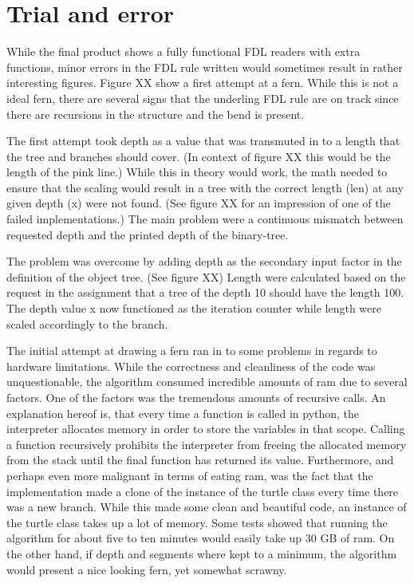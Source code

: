 \documentclass[titlepage]{article}
\begin{document}
\section{Trial and error}
While the final product shows a fully functional FDL readers with extra functions, minor errors in the FDL rule written would sometimes result in rather interesting figures. Figure XX  show a first attempt at a fern. While this is not a ideal fern, there are several signs that the underling FDL rule are on track since there are recursions in the structure and the bend is present. \par
The first attempt took depth as a value that was transmuted in to a length that the tree and branches should cover. (In context of figure XX  this would be the length of the pink line.) 
While this in theory would work, the math needed to ensure that the scaling would result in a tree with the correct length (len) at any given depth (x) were not found. (See figure XX  for an impression of one of the failed implementations.) The main problem were a continuous mismatch between requested depth and the printed depth of the binary-tree. \par
The problem was overcome by adding depth as the secondary input factor in the definition of the object tree. (See figure XX)  Length were calculated based on the request in the assignment that a tree of the depth 10 should have the length 100. The depth value x now functioned as the iteration counter while length were scaled accordingly to the branch.\par  
The initial attempt at drawing a fern ran in to some problems in regards to hardware limitations. While the correctness and cleanliness of the code was unquestionable, the algorithm consumed incredible amounts of ram due to several factors. One of the factors was the tremendous amounts of recursive calls. An explanation hereof is, that every time a function is called in python, the interpreter allocates memory in order to store the variables in that scope. Calling a function recursively prohibits the interpreter from freeing the allocated memory from the stack until the final function has returned its value. Furthermore, and perhaps even more malignant in terms of eating ram, was the fact that the implementation made a clone of the instance of the turtle class every time there was a new branch. While this made some clean and beautiful code, an instance of the turtle class takes up a lot of memory. Some tests showed that running the algorithm for about five to ten minutes would easily take up 30 GB of ram. On the other hand, if depth and segments where kept to a minimum, the algorithm would present a nice looking fern, yet somewhat scrawny.
\end{document}
